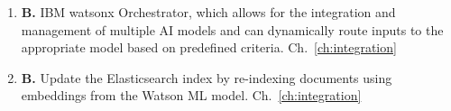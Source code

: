 \begin{enumerate}[resume,leftmargin=*]
  \item \textbf{B.} IBM watsonx Orchestrator, which allows for the integration and management of multiple AI models and can dynamically route inputs to the appropriate model based on predefined criteria. \hfill Ch.~\ref{ch:integration}
  \item \textbf{B.} Update the Elasticsearch index by re-indexing documents using embeddings from the Watson ML model. \hfill Ch.~\ref{ch:integration}
\end{enumerate}

\cleardoublepage
